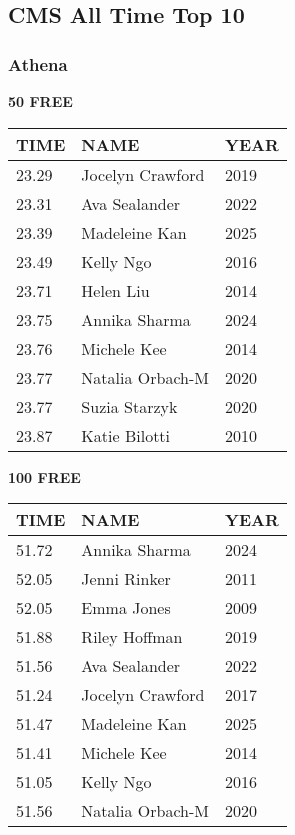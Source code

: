 \subsection{CMS All Time Top 10}
\subsubsection{Athena}

\begin{minipage}[t]{0.48\textwidth}
\centering
\textbf{50 FREE}\\[0.05cm]
\begin{tabular}{@{}p{1.8cm}p{2.8cm}p{1.2cm}@{}}
\hline
\textbf{TIME} & \textbf{NAME} & \textbf{YEAR} \\
\hline
23.29 & Jocelyn Crawford & 2019 \\
23.31 & Ava Sealander & 2022 \\
23.39 & Madeleine Kan & 2025 \\
23.49 & Kelly Ngo & 2016 \\
23.71 & Helen Liu & 2014 \\
23.75 & Annika Sharma & 2024 \\
23.76 & Michele Kee & 2014 \\
23.77 & Natalia Orbach-M & 2020 \\
23.77 & Suzia Starzyk & 2020 \\
23.87 & Katie Bilotti & 2010 \\
\hline
\end{tabular}
\end{minipage}\hfill
\begin{minipage}[t]{0.48\textwidth}
\centering
\textbf{100 FREE}\\[0.05cm]
\begin{tabular}{@{}p{1.8cm}p{2.8cm}p{1.2cm}@{}}
\hline
\textbf{TIME} & \textbf{NAME} & \textbf{YEAR} \\
\hline
51.72 & Annika Sharma & 2024 \\
52.05 & Jenni Rinker & 2011 \\
52.05 & Emma Jones & 2009 \\
51.88 & Riley Hoffman & 2019 \\
51.56 & Ava Sealander & 2022 \\
51.24 & Jocelyn Crawford & 2017 \\
51.47 & Madeleine Kan & 2025 \\
51.41 & Michele Kee & 2014 \\
51.05 & Kelly Ngo & 2016 \\
51.56 & Natalia Orbach-M & 2020 \\
\hline
\end{tabular}
\end{minipage}

